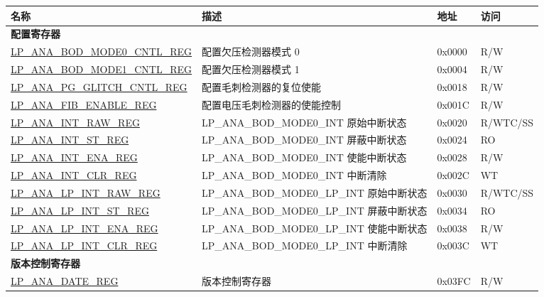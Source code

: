 \begin{longtable}{ | l | l | l | l | }
\hline\rowcolor{lightgray}
\textbf{名称} & \textbf{描述} &  \textbf{地址} & \textbf{访问} \\ \hline
\endhead
\multicolumn{4}{|l|}{\textbf{配置寄存器}} \\ \hline
\hyperref[regdesc:LPANABODMODE0CNTLREG]{LP\_ANA\_BOD\_MODE0\_CNTL\_REG} & 配置欠压检测器模式 0 & 0x0000 & R/W \\ \hline
\hyperref[regdesc:LPANABODMODE1CNTLREG]{LP\_ANA\_BOD\_MODE1\_CNTL\_REG} & 配置欠压检测器模式 1 & 0x0004 & R/W \\ \hline
\hyperref[regdesc:LPANAPGGLITCHCNTLREG]{LP\_ANA\_PG\_GLITCH\_CNTL\_REG} & 配置毛刺检测器的复位使能 & 0x0018 & R/W \\ \hline
\hyperref[regdesc:LPANAFIBENABLEREG]{LP\_ANA\_FIB\_ENABLE\_REG} & 配置电压毛刺检测器的使能控制 & 0x001C & R/W \\ \hline
\hyperref[regdesc:LPANAINTRAWREG]{LP\_ANA\_INT\_RAW\_REG} & LP\_ANA\_BOD\_MODE0\_INT 原始中断状态 & 0x0020 & R/WTC/SS \\ \hline
\hyperref[regdesc:LPANAINTSTREG]{LP\_ANA\_INT\_ST\_REG} & LP\_ANA\_BOD\_MODE0\_INT 屏蔽中断状态 & 0x0024 & RO \\ \hline
\hyperref[regdesc:LPANAINTENAREG]{LP\_ANA\_INT\_ENA\_REG} & LP\_ANA\_BOD\_MODE0\_INT 使能中断状态 & 0x0028 & R/W \\ \hline
\hyperref[regdesc:LPANAINTCLRREG]{LP\_ANA\_INT\_CLR\_REG} & LP\_ANA\_BOD\_MODE0\_INT 中断清除 & 0x002C & WT \\ \hline
\hyperref[regdesc:LPANALPINTRAWREG]{LP\_ANA\_LP\_INT\_RAW\_REG} & LP\_ANA\_BOD\_MODE0\_LP\_INT 原始中断状态 & 0x0030 & R/WTC/SS \\ \hline
\hyperref[regdesc:LPANALPINTSTREG]{LP\_ANA\_LP\_INT\_ST\_REG} & LP\_ANA\_BOD\_MODE0\_LP\_INT 屏蔽中断状态 & 0x0034 & RO \\ \hline
\hyperref[regdesc:LPANALPINTENAREG]{LP\_ANA\_LP\_INT\_ENA\_REG} & LP\_ANA\_BOD\_MODE0\_LP\_INT 使能中断状态 & 0x0038 & R/W \\ \hline
\hyperref[regdesc:LPANALPINTCLRREG]{LP\_ANA\_LP\_INT\_CLR\_REG} & LP\_ANA\_BOD\_MODE0\_LP\_INT 中断清除 & 0x003C & WT \\ \hline
\multicolumn{4}{|l|}{\textbf{版本控制寄存器}} \\ \hline
\hyperref[regdesc:LPANADATEREG]{LP\_ANA\_DATE\_REG} & 版本控制寄存器 & 0x03FC & R/W \\ \hline
\end{longtable}
